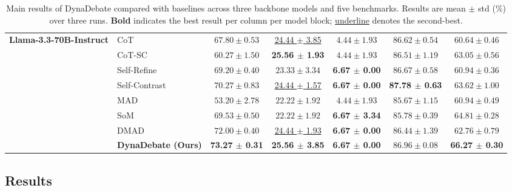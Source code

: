 \begin{table}[t]
{\begin{tabular}{llccccc}
\multirow{8}{*}{\textbf{Llama-3.3-70B-Instruct}}
 & CoT              & $67.80 \pm 0.53$                  &  \underline{24.44 $\pm$ 3.85}                  & \underline{$4.44 \pm 1.93$}        & $86.62 \pm 0.54$                  & $60.64 \pm 0.46$ \\
 & CoT-SC           & $60.27 \pm 1.50$                  & \textbf{25.56 $\pm$ 1.93}          & \underline{$4.44 \pm 1.93$}        & $86.51 \pm 1.19$                  & $63.05 \pm 0.56$ \\
 & Self-Refine      & $69.20 \pm 0.40$                  & $23.33 \pm 3.34$                  & \textbf{6.67 $\pm$ 0.00}           & $86.67 \pm 0.58$                  & $60.94 \pm 0.36$ \\
 & Self-Contrast    & $70.27 \pm 0.83$                  &  \underline{24.44 $\pm$ 1.57}                  & \textbf{6.67 $\pm$ 0.00}           & \textbf{87.78 $\pm$ 0.63}          & $63.62 \pm 1.00$ \\
 & MAD              & $53.20 \pm 2.78$                  & $22.22 \pm 1.92$                  & \underline{$4.44 \pm 1.93$}        & $85.67 \pm 1.15$                  & $60.94 \pm 0.49$ \\
 & SoM              & $69.53 \pm 0.50$                  & $22.22 \pm 1.92$                  & \textbf{6.67 $\pm$ 3.34}           & $85.78 \pm 0.39$                  & \underline{$64.81 \pm 0.28$} \\
 & DMAD             & \underline{$72.00 \pm 0.40$}       & \underline{24.44 $\pm$ 1.93}                  & \textbf{6.67 $\pm$ 0.00}           & $86.44 \pm 1.39$                  & $62.76 \pm 0.79$ \\
 & \textbf{DynaDebate (Ours)} & \textbf{73.27 $\pm$ 0.31}   & \textbf{25.56 $\pm$ 3.85}       & \textbf{6.67 $\pm$ 0.00}           & \underline{$86.96 \pm 0.08$}       & \textbf{66.27 $\pm$ 0.30} \\
\bottomrule
\end{tabular}
}
\caption{
Main results of DynaDebate compared with baselines across three backbone models and five benchmarks. Results are mean $\pm$ std (\%) over three runs.
\textbf{Bold} indicates the best result per column per model block; \underline{underline} denotes the second-best.
}
\label{tab:main_results}
\vspace{-4pt}
\end{table}

\subsection{Results}

